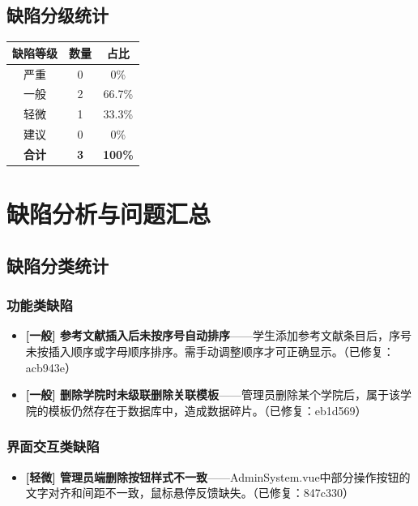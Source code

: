 \documentclass[a4paper,12pt]{article}
\begin{document}
\subsection{缺陷分级统计}
\begin{center}
\begin{tabular}{|c|c|c|}
\hline
缺陷等级 & 数量 & 占比 \\
\hline
严重 & 0 & 0\% \\
一般 & 2 & 66.7\% \\
轻微 & 1 & 33.3\% \\
建议 & 0 & 0\% \\
\hline
\textbf{合计} & \textbf{3} & \textbf{100\%} \\
\hline
\end{tabular}
\end{center}

\section{缺陷分析与问题汇总}

\subsection{缺陷分类统计}
\subsubsection{功能类缺陷}
\begin{itemize}
  \item \textbf{[一般] 参考文献插入后未按序号自动排序}——学生添加参考文献条目后，序号未按插入顺序或字母顺序排序。需手动调整顺序才可正确显示。（已修复：acb943e）
  \item \textbf{[一般] 删除学院时未级联删除关联模板}——管理员删除某个学院后，属于该学院的模板仍然存在于数据库中，造成数据碎片。（已修复：eb1d569）
\end{itemize}

\subsubsection{界面交互类缺陷}
\begin{itemize}
  \item \textbf{[轻微] 管理员端删除按钮样式不一致}——AdminSystem.vue中部分操作按钮的文字对齐和间距不一致，鼠标悬停反馈缺失。（已修复：847c330）
\end{itemize}
\end{document}
